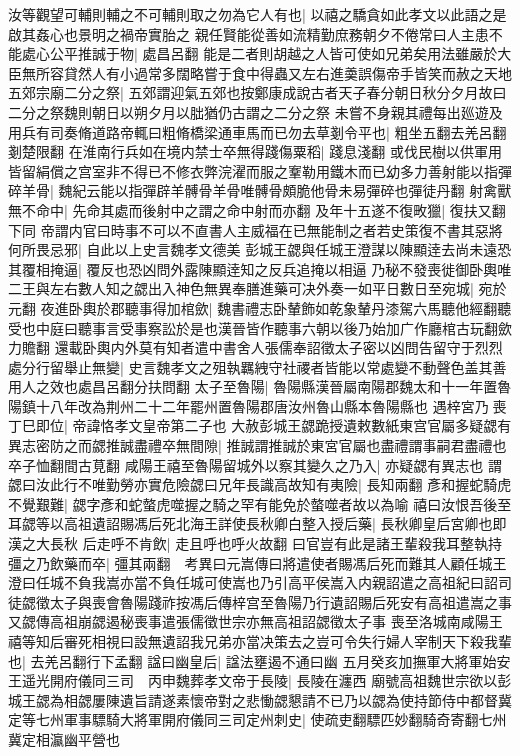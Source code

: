 汝等觀望可輔則輔之不可輔則取之勿為它人有也|{
	以禧之驕貪如此孝文以此語之是啟其姦心也景明之禍帝實胎之}
親任賢能從善如流精勤庶務朝夕不倦常曰人主患不能處心公平推誠于物|{
	處昌呂翻}
能是二者則胡越之人皆可使如兄弟矣用法雖嚴於大臣無所容貸然人有小過常多闊略嘗于食中得蟲又左右進羮誤傷帝手皆笑而赦之天地五郊宗廟二分之祭|{
	五郊謂迎氣五郊也按鄭康成說古者天子春分朝日秋分夕月故曰二分之祭魏則朝日以朔夕月以朏猶仍古謂之二分之祭}
未嘗不身親其禮每出廵遊及用兵有司奏脩道路帝輒曰粗脩橋梁通車馬而已勿去草剗令平也|{
	粗坐五翻去羌呂翻剗楚限翻}
在淮南行兵如在境内禁士卒無得踐傷粟稻|{
	踐息淺翻}
或伐民樹以供軍用皆留絹償之宫室非不得已不修衣弊浣濯而服之鞌勒用鐵木而已幼多力善射能以指彈碎羊骨|{
	魏紀云能以指彈辟羊髆骨羊骨唯髆骨頗脆他骨未易彈碎也彈徒丹翻}
射禽獸無不命中|{
	先命其處而後射中之謂之命中射而亦翻}
及年十五遂不復畋獵|{
	復扶又翻下同}
帝謂内官曰時事不可以不直書人主威福在已無能制之者若史策復不書其惡將何所畏忌邪|{
	自此以上史言魏孝文德美}
彭城王勰與任城王澄謀以陳顯逹去尚未遠恐其覆相掩逼|{
	覆反也恐凶問外露陳顯逹知之反兵追掩以相逼}
乃秘不發喪徙御卧輿唯二王與左右數人知之勰出入神色無異奉膳進藥可决外奏一如平日數日至宛城|{
	宛於元翻}
夜進卧輿於郡聽事得加棺歛|{
	魏書禮志卧輦飾如乾象輦丹漆駕六馬聽他經翻聽受也中庭曰聽事言受事察訟於是也漢晉皆作聽事六朝以後乃始加广作廳棺古玩翻歛力贍翻}
還載卧輿内外莫有知者遣中書舍人張儒奉詔徵太子密以凶問告留守于烈烈處分行留舉止無變|{
	史言魏孝文之殂執羈絏守社禝者皆能以常處變不動聲色盖其善用人之效也處昌呂翻分扶問翻}
太子至魯陽|{
	魯陽縣漢晉屬南陽郡魏太和十一年置魯陽鎮十八年改為荆州二十二年罷州置魯陽郡唐汝州魯山縣本魯陽縣也}
遇梓宮乃喪丁巳即位|{
	帝諱恪孝文皇帝第二子也}
大赦彭城王勰跪授遺敕數紙東宫官屬多疑勰有異志密防之而勰推誠盡禮卒無間隙|{
	推誠謂推誠於東宮官屬也盡禮謂事嗣君盡禮也卒子恤翻間古莧翻}
咸陽王禧至魯陽留城外以察其變久之乃入|{
	亦疑勰有異志也}
謂勰曰汝此行不唯勤勞亦實危險勰曰兄年長識高故知有夷險|{
	長知兩翻}
彥和握蛇騎虎不覺艱難|{
	勰字彥和蛇螫虎噬握之騎之罕有能免於螫噬者故以為喻}
禧曰汝恨吾後至耳勰等以高祖遺詔賜馮后死北海王詳使長秋卿白整入授后藥|{
	長秋卿皇后宮卿也即漢之大長秋}
后走呼不肯飲|{
	走且呼也呼火故翻}
曰官豈有此是諸王輩殺我耳整執持彊之乃飲藥而卒|{
	彊其兩翻　考異曰元嵩傳曰將遣使者賜馮后死而難其人顧任城王澄曰任城不負我嵩亦當不負任城可使嵩也乃引高平侯嵩入内親詔遣之高祖紀曰詔司徒勰徵太子與喪會魯陽踐祚按馮后傳梓宫至魯陽乃行遺詔賜后死安有高祖遣嵩之事又勰傳高祖崩勰遏秘喪事遣張儒徵世宗亦無高祖詔勰徵太子事}
喪至洛城南咸陽王禧等知后審死相視曰設無遺詔我兄弟亦當决策去之豈可令失行婦人宰制天下殺我輩也|{
	去羌呂翻行下孟翻}
諡曰幽皇后|{
	諡法壅遏不通曰幽}
五月癸亥加撫軍大將軍始安王遥光開府儀同三司　丙申魏葬孝文帝于長陵|{
	長陵在瀍西}
廟號高祖魏世宗欲以彭城王勰為相勰屢陳遺旨請遂素懷帝對之悲慟勰懇請不已乃以勰為使持節侍中都督冀定等七州軍事驃騎大將軍開府儀同三司定州刺史|{
	使疏吏翻驃匹妙翻騎奇寄翻七州冀定相瀛幽平營也}
